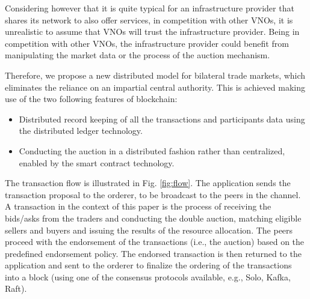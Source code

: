 \documentclass[conference]{IEEEtran}
\begin{document}
Considering however that it is quite typical for an infrastructure provider that shares its network to also offer services, in competition with other VNOs, it is unrealistic to assume that VNOs will trust the infrastructure provider. Being in competition with other VNOs, the infrastructure provider could benefit from manipulating the market data or the process of the auction mechanism. 

Therefore, we propose a new distributed model for bilateral trade markets, which eliminates the reliance on an impartial central authority. This is achieved making use of the two following features of blockchain:

\begin{itemize}
    \item Distributed record keeping of all the transactions and participants data using the distributed ledger technology.
    \item Conducting the auction in a distributed fashion rather than centralized, enabled by the smart contract technology.
\end{itemize}



The transaction flow is illustrated in Fig.  \ref{fig:flow}. The application sends the transaction proposal to the orderer, to be broadcast to the peers in the channel. A transaction in the context of this paper is the process of receiving the bids/asks from the traders and conducting the double auction, matching eligible sellers and buyers and issuing the results of the resource allocation. The peers proceed with the endorsement of the transactions (i.e., the auction) based on the predefined endorsement policy. The endorsed transaction is then returned to the application and sent to the orderer to finalize the ordering of the transactions into a block (using one of the consensus protocols available, e.g., Solo, Kafka, Raft).

\end{document}
